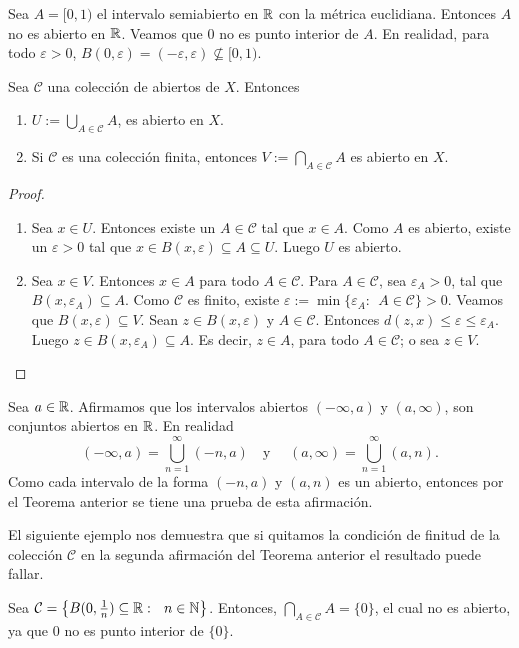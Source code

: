 \begin{example}
Sea $A=[0,1)$ el intervalo semiabierto en $\mathbb{R}$ con la métrica euclidiana. Entonces $A$ no es abierto en $\mathbb{R}$. Veamos que  $0$ no es punto interior de $A$. En realidad, para todo $\varepsilon >0$, $B(0,\varepsilon )=(-\varepsilon, \varepsilon) \not \subseteq [0,1).$
\end{example}

\begin{teorema}\label{uni-inter-ab}
Sea $\mathcal{C}$ una colección de abiertos de $X$. Entonces
\begin{enumerate}
    \item $U:=\bigcup_{A\in \mathcal{C}}A$, es abierto en $X$.
    \item Si $\mathcal{C}$ es una colección finita, entonces $V:=\bigcap_{A\in \mathcal{C}}A$ es abierto en $X$.
\end{enumerate}
\end{teorema}
\begin{proof}
\begin{enumerate}
    \item Sea $x\in U$. Entonces existe un $A\in \mathcal{C}$ tal que $x\in A$. Como $A$ es abierto, existe un $\varepsilon>0$ tal que $x\in B(x, \varepsilon) \subseteq A \subseteq U.$ Luego $U $ es abierto.
    \item Sea $x\in V$. Entonces  $x\in A $ para todo $A\in \mathcal{C}.$ Para $A\in \mathcal{C}$, sea $\varepsilon_A >0$, tal que $B(x, \varepsilon_A)\subseteq A$. Como $\mathcal{C}$ es finito, existe $\varepsilon:=\min\{\varepsilon_A: \ \ A\in \mathcal{C} \}>0.$ Veamos que $B(x, \varepsilon)\subseteq V.$ Sean $z\in B(x, \varepsilon)$ y $A\in \mathcal{C}$. Entonces $d(z,x)\leq \varepsilon \leq \varepsilon_A$. Luego  $z\in B(x, \varepsilon_A)\subseteq A$. Es decir,  $z\in A$, para todo $A\in \mathcal{C}$; o sea $z\in V$.
\end{enumerate}
\end{proof}

\begin{example}
Sea $a\in \mathbb{R}$. Afirmamos que los intervalos abiertos $(-\infty, a)$ y $(a, \infty)$, son conjuntos abiertos en $\mathbb{R}$. En realidad
\[(-\infty , a) = \bigcup_{n=1}^\infty (-n, a ) \quad \text{y }\quad (a, \infty ) = \bigcup_{n=1}^\infty ( a, n ) .\]
Como cada intervalo de la forma $(-n,a)$ y $(a,n)$ es un abierto, entonces por el Teorema anterior se tiene una prueba de esta afirmación.
\end{example}

El siguiente ejemplo nos demuestra que si quitamos la condición de finitud de la colección $\mathcal{C}$ en la segunda afirmación del Teorema anterior el resultado puede fallar.
\begin{example}
Sea $\mathcal{C}= \left\{ B(0, \frac{1}{n})\subseteq \mathbb{R}: \ \ n\in \mathbb{N}\right\}$. Entonces, $\bigcap_{A\in \mathcal{C}}A=\{0\}$, el cual no es abierto, ya que $0$ no es punto interior de $\{0\}.$
\end{example}


